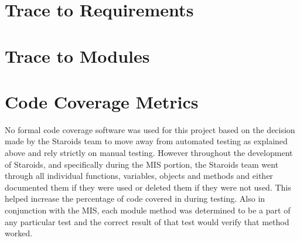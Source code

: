 \documentclass[12pt, titlepage]{article}
\begin{document}
\section{Trace to Requirements}
\section{Trace to Modules}
\section{Code Coverage Metrics}
No formal code coverage software was used for this project based on the decision made by the Staroids team to move away from automated testing as explained above and rely strictly on manual testing. However throughout the development of Staroids, and specifically during the MIS portion, the Staroids team went through all individual functions, variables, objects and methods and either documented them if they were used or deleted them if they were not used. This helped increase the percentage of code covered in during testing. Also in conjunction with the MIS, each module method was determined to be a part of any particular test and the correct result of that test would verify that method worked.




\end{document}
